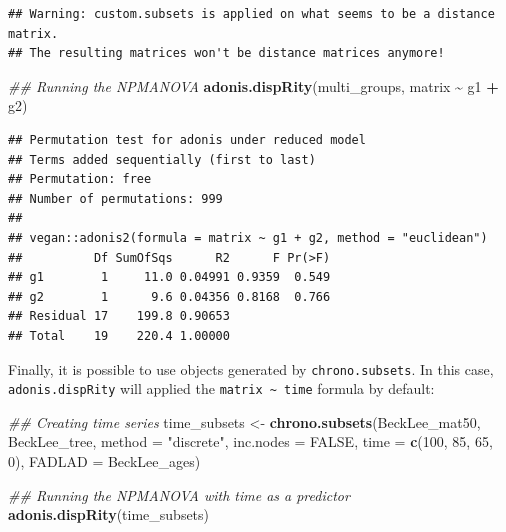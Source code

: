 \documentclass[
]{book}
\newenvironment{Shaded}{\begin{snugshade}}{\end{snugshade}}
\newcommand{\CommentTok}[1]{\textcolor[rgb]{0.56,0.35,0.01}{\textit{#1}}}
\newcommand{\DataTypeTok}[1]{\textcolor[rgb]{0.13,0.29,0.53}{#1}}
\newcommand{\DecValTok}[1]{\textcolor[rgb]{0.00,0.00,0.81}{#1}}
\newcommand{\KeywordTok}[1]{\textcolor[rgb]{0.13,0.29,0.53}{\textbf{#1}}}
\newcommand{\NormalTok}[1]{#1}
\newcommand{\OperatorTok}[1]{\textcolor[rgb]{0.81,0.36,0.00}{\textbf{#1}}}
\newcommand{\OtherTok}[1]{\textcolor[rgb]{0.56,0.35,0.01}{#1}}
\newcommand{\StringTok}[1]{\textcolor[rgb]{0.31,0.60,0.02}{#1}}
\begin{document}
\begin{verbatim}
## Warning: custom.subsets is applied on what seems to be a distance matrix.
## The resulting matrices won't be distance matrices anymore!
\end{verbatim}

\begin{Shaded}
\begin{Highlighting}[]
\CommentTok{\#\# Running the NPMANOVA}
\KeywordTok{adonis.dispRity}\NormalTok{(multi\_groups, matrix }\OperatorTok{\textasciitilde{}}\StringTok{ }\NormalTok{g1 }\OperatorTok{+}\StringTok{ }\NormalTok{g2)}
\end{Highlighting}
\end{Shaded}

\begin{verbatim}
## Permutation test for adonis under reduced model
## Terms added sequentially (first to last)
## Permutation: free
## Number of permutations: 999
## 
## vegan::adonis2(formula = matrix ~ g1 + g2, method = "euclidean")
##          Df SumOfSqs      R2      F Pr(>F)
## g1        1     11.0 0.04991 0.9359  0.549
## g2        1      9.6 0.04356 0.8168  0.766
## Residual 17    199.8 0.90653              
## Total    19    220.4 1.00000
\end{verbatim}

Finally, it is possible to use objects generated by \texttt{chrono.subsets}.
In this case, \texttt{adonis.dispRity} will applied the \texttt{matrix\ \textasciitilde{}\ time} formula by default:

\begin{Shaded}
\begin{Highlighting}[]
\CommentTok{\#\# Creating time series}
\NormalTok{time\_subsets \textless{}{-}}\StringTok{ }\KeywordTok{chrono.subsets}\NormalTok{(BeckLee\_mat50, BeckLee\_tree,}
                               \DataTypeTok{method =} \StringTok{"discrete"}\NormalTok{,}
                               \DataTypeTok{inc.nodes =} \OtherTok{FALSE}\NormalTok{,}
                               \DataTypeTok{time =} \KeywordTok{c}\NormalTok{(}\DecValTok{100}\NormalTok{, }\DecValTok{85}\NormalTok{, }\DecValTok{65}\NormalTok{, }\DecValTok{0}\NormalTok{),}
                               \DataTypeTok{FADLAD =}\NormalTok{ BeckLee\_ages)}

\CommentTok{\#\# Running the NPMANOVA with time as a predictor}
\KeywordTok{adonis.dispRity}\NormalTok{(time\_subsets)}
\end{Highlighting}
\end{Shaded}
\end{document}
